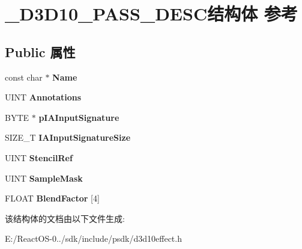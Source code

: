 \hypertarget{struct___d3_d10___p_a_s_s___d_e_s_c}{}\section{\+\_\+\+D3\+D10\+\_\+\+P\+A\+S\+S\+\_\+\+D\+E\+S\+C结构体 参考}
\label{struct___d3_d10___p_a_s_s___d_e_s_c}
\subsection*{Public 属性}
\begin{DoxyCompactItemize}
\item 
\mbox{\label{struct___d3_d10___p_a_s_s___d_e_s_c_a8ec8e8d28c5ca72259fc9579c0b4903d}} 
const char $\ast$ {\bfseries Name}
\item 
\mbox{\label{struct___d3_d10___p_a_s_s___d_e_s_c_a7c6b6cc990bcc981fe409e24c715bc30}} 
U\+I\+NT {\bfseries Annotations}
\item 
\mbox{\label{struct___d3_d10___p_a_s_s___d_e_s_c_a7a7135832d5ed80de28101c6a1e79177}} 
B\+Y\+TE $\ast$ {\bfseries p\+I\+A\+Input\+Signature}
\item 
\mbox{\label{struct___d3_d10___p_a_s_s___d_e_s_c_a3bda02074cdd001a7e1ffb7f81a12e49}} 
S\+I\+Z\+E\+\_\+T {\bfseries I\+A\+Input\+Signature\+Size}
\item 
\mbox{\label{struct___d3_d10___p_a_s_s___d_e_s_c_a6a6fa02f8ba22b5363cc14b35058d269}} 
U\+I\+NT {\bfseries Stencil\+Ref}
\item 
\mbox{\label{struct___d3_d10___p_a_s_s___d_e_s_c_a86481eafe23f32e559d270e7d7b35d35}} 
U\+I\+NT {\bfseries Sample\+Mask}
\item 
\mbox{\label{struct___d3_d10___p_a_s_s___d_e_s_c_ae18cbcafef43ee6fd71a255c75f6b5ba}} 
F\+L\+O\+AT {\bfseries Blend\+Factor} \mbox{[}4\mbox{]}
\end{DoxyCompactItemize}


该结构体的文档由以下文件生成\+:\begin{DoxyCompactItemize}
\item 
E\+:/\+React\+O\+S-\/0../sdk/include/psdk/d3d10effect.\+h\end{DoxyCompactItemize}
